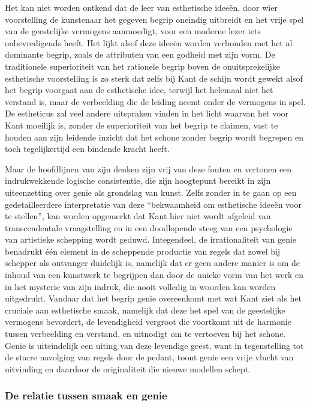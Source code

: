 Het kan niet worden ontkend dat de leer van esthetische ideeën, door wier voorstelling de kunstenaar het gegeven begrip oneindig uitbreidt en het vrije spel van de geestelijke vermogens aanmoedigt, voor een moderne lezer iets onbevredigends heeft. Het lijkt alsof deze ideeën worden verbonden met het al dominante begrip, zoals de attributen van een godheid met zijn vorm. De traditionele superioriteit van het rationele begrip boven de onuitsprekelijke esthetische voorstelling is zo sterk dat zelfs bij Kant de schijn wordt gewekt alsof het begrip voorgaat aan de esthetische idee, terwijl het helemaal niet het verstand is, maar de verbeelding die de leiding neemt onder de vermogens in spel. De estheticus zal veel andere uitspraken vinden in het licht waarvan het voor Kant moeilijk is, zonder de superioriteit van het begrip te claimen, vast te houden aan zijn leidende inzicht dat het schone zonder begrip wordt begrepen en toch tegelijkertijd een bindende kracht heeft.

Maar de hoofdlijnen van zijn denken zijn vrij van deze fouten en vertonen een indrukwekkende logische consistentie, die zijn hoogtepunt bereikt in zijn uiteenzetting over genie als grondslag van kunst. Zelfs zonder in te gaan op een gedetailleerdere interpretatie van deze ``bekwaamheid om esthetische ideeën voor te stellen'', kan worden opgemerkt dat Kant hier niet wordt afgeleid van transcendentale vraagstelling en in een doodlopende steeg van een psychologie van artistieke schepping wordt geduwd. Integendeel, de irrationaliteit van genie benadrukt één element in de scheppende productie van regels dat zowel bij schepper als ontvanger duidelijk is, namelijk dat er geen andere manier is om de inhoud van een kunstwerk te begrijpen dan door de unieke vorm van het werk en in het mysterie van zijn indruk, die nooit volledig in woorden kan worden uitgedrukt. Vandaar dat het begrip genie overeenkomt met wat Kant ziet als het cruciale aan esthetische smaak, namelijk dat deze het spel van de geestelijke vermogens bevordert, de levendigheid vergroot die voortkomt uit de harmonie tussen verbeelding en verstand, en uitnodigt om te vertoeven bij het schone. Genie is uiteindelijk een uiting van deze levendige geest, want in tegenstelling tot de starre navolging van regels door de pedant, toont genie een vrije vlucht van uitvinding en daardoor de originaliteit die nieuwe modellen schept.

\subsubsection{De relatie tussen smaak en genie}

